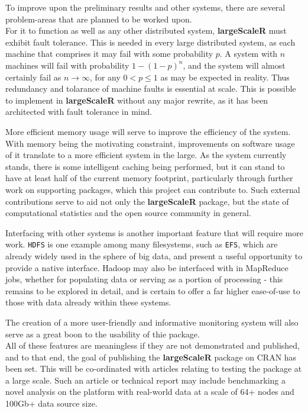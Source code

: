 To improve upon the preliminary results and other systems, there are several problem-areas that are planned to be worked upon.\\

For it to function as well as any other distributed system, \textbf{largeScaleR} must exhibit fault tolerance.
This is needed in every large distributed system, as each machine that comprises it may fail with some probability \(p\).
A system with \(n\) machines will fail with probability \(1-(1-p)^n\), and the system will almost certainly fail as \(n \to \infty\), for any \(0 < p \leq 1\) as may be expected in reality.
Thus redundancy and tolarance of machine faults is essential at scale.
This is possible to implement in \textbf{largeScaleR} without any major rewrite, as it has been architected with fault tolerance in mind.

More efficient memory usage will serve to improve the efficiency of the system.
With memory being the motivating constraint, improvements on software usage of it translate to a more efficient system in the large.
As the system currently stands, there is some intelligent caching being performed, but it can stand to have at least half of the current memory footprint, particularly through further work on supporting packages, which this project can contribute to.
Such external contributions serve to aid not only the \textbf{largeScaleR} package, but the state of computational statistics and the open source community in general.

Interfacing with other systems is another important feature that will require more work.
\texttt{HDFS} is one example among many filesystems, such as \texttt{EFS}, which are already widely used in the sphere of big data, and present a useful opportunity to provide a native interface.
Hadoop may also be interfaced with in MapReduce jobs, whether for populating data or serving as a portion of processing - this remains to be explored in detail, and is certain to offer a far higher ease-of-use to those with data already within these systems.

The creation of a more user-friendly and informative monitoring system will also serve as a great boon to the usability of thie package.\\

All of these features are meaningless if they are not demonstrated and published, and to that end, the goal of publishing the \textbf{largeScaleR} package on CRAN has been set.
This will be co-ordinated with articles relating to testing the package at a large scale.
Such an article or technical report may include benchmarking a novel analysis on the platform with real-world data at a scale of 64+ nodes and 100Gb+ data source size.
